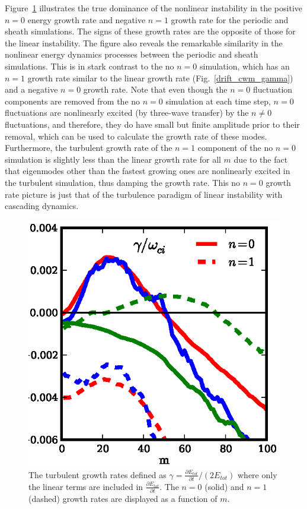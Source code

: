 \documentclass[showpacs,preprintnumbers,amsmath,amssymb,superscriptaddress,aip]{revtex4-1}
\newcommand{\pdiff}[2]{\frac{\partial#1}{\partial#2}}
\begin{document}
Figure~\ref{nl_vs_lin_gamma} illustrates the true dominance of the nonlinear instability in the positive $n=0$ energy growth rate and negative $n=1$ growth rate for the periodic and sheath simulations. 
The signs of these growth rates are the opposite of those for the linear instability.
The figure also reveals the remarkable similarity in the nonlinear energy dynamics processes between the periodic and sheath simulations. 
This is in stark contrast to the no $n=0$ simulation, which has an $n=1$
growth rate similar to the linear growth rate (Fig.~\ref{drift_cwm_gamma}) and a negative $n=0$ growth rate. Note that even though the $n=0$ fluctuation components are 
removed from the no $n=0$ simulation at each time
step, $n=0$ fluctuations are nonlinearly excited (by three-wave transfer) by the $n \ne 0$ fluctuations, 
and therefore, they do have small but finite amplitude prior to their removal, which can be used to
calculate the growth rate of these modes. Furthermore, the turbulent growth rate of the $n=1$ component of the no $n=0$ simulation is
slightly less than the linear growth rate for all $m$ due to the fact that eigenmodes other than the fastest growing ones are nonlinearly excited in the turbulent simulation, 
thus damping the growth rate.
This no $n=0$ growth rate picture is just that of the turbulence paradigm of linear instability with cascading dynamics. 


\begin{figure}[!htbp]
\includegraphics[]{lin_vs_nl_gamma}
\hfil
\caption{ The turbulent growth rates defined as $\gamma = \pdiff{E_{tot}}{t}/(2 E_{tot})$ where only the linear terms are included in $\pdiff{E_{tot}}{t}$. The $n=0$ (solid) and $n = 1$ (dashed) 
growth rates are displayed as a function of $m$.}
\label{nl_vs_lin_gamma}
\end{figure}
\end{document}
